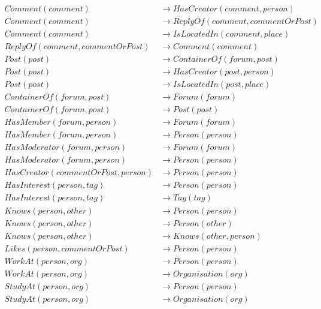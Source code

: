 \begin{figure}[H]
    \centering
    \begin{adjustbox}{max width=\linewidth,max height=.5\textheight}
        \parbox{\linewidth}{\begin{align*}
            Comment(comment) &\to HasCreator(comment, person) \\
            Comment(comment) &\to ReplyOf(comment, commentOrPost) \\
            Comment(comment) &\to IsLocatedIn(comment, place) \\
            ReplyOf(comment, commentOrPost) &\to Comment(comment) \\
            Post(post) &\to ContainerOf(forum, post) \\
            Post(post) &\to HasCreator(post, person) \\
            Post(post) &\to IsLocatedIn(post, place) \\
            ContainerOf(forum, post) &\to Forum(forum) \\
            ContainerOf(forum, post) &\to Post(post) \\
            HasMember(forum, person) &\to Forum(forum) \\
            HasMember(forum, person) &\to Person(person) \\
            HasModerator(forum, person) &\to Forum(forum) \\
            HasModerator(forum, person) &\to Person(person) \\
            HasCreator(commentOrPost, person) &\to Person(person) \\
            HasInterest(person, tag) &\to Person(person) \\
            HasInterest(person, tag) &\to Tag(tag) \\
            Knows(person, other) &\to Person(person) \\
            Knows(person, other) &\to Person(other) \\
            Knows(person, other) &\to Knows(other, person) \\
            Likes(person, commentOrPost) &\to Person(person) \\
            WorkAt(person, org) &\to Person(person) \\
            WorkAt(person, org) &\to Organisation(org) \\
            StudyAt(person, org) &\to Person(person) \\
            StudyAt(person, org) &\to Organisation(org) \\

\end{align*}}
\end{adjustbox}
\end{figure}
